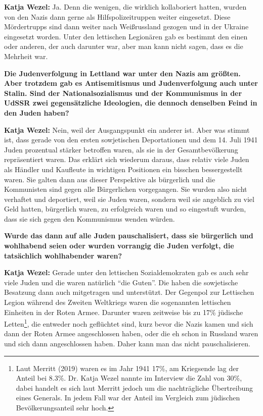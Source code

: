 \textbf{Katja Wezel:} Ja. Denn die wenigen, die wirklich kollaboriert hatten, wurden von den Nazis dann gerne als Hilfspolizeitruppen weiter eingesetzt. Diese Mördertrupps sind dann weiter nach Weißrussland gezogen und in der Ukraine eingesetzt worden. Unter den lettischen Legionären gab es bestimmt den einen oder anderen, der auch darunter war, aber man kann nicht sagen, dass es die Mehrheit war.

\textbf{Die Judenverfolgung in Lettland war unter den Nazis am größten. Aber trotzdem gab es Antisemitismus und Judenverfolgung auch unter Stalin. Sind der Nationalsozialismus und der Kommunismus in der UdSSR zwei gegensätzliche Ideologien, die dennoch denselben Feind in den Juden haben?}

\textbf{Katja Wezel:} Nein, weil der Ausgangspunkt ein anderer ist. Aber was stimmt ist, dass gerade von den ersten sowjetischen Deportationen und dem 14. Juli 1941 Juden prozentual stärker betroffen waren, als sie in der Gesamtbevölkerung repräsentiert waren. Das erklärt sich wiederum daraus, dass relativ viele Juden als Händler und Kaufleute in wichtigen Positionen ein bisschen bessergestellt waren. Sie galten dann aus dieser Perspektive als bürgerlich und die Kommunisten sind gegen alle Bürgerlichen vorgegangen. Sie wurden also nicht verhaftet und deportiert, weil sie Juden waren, sondern weil sie angeblich zu viel Geld hatten, bürgerlich waren, zu erfolgreich waren und so eingestuft wurden, dass sie sich gegen den Kommunismus wenden würden. 

\textbf{Wurde das dann auf alle Juden pauschalisiert, dass sie bürgerlich und wohlhabend seien oder wurden vorrangig die Juden verfolgt, die tatsächlich wohlhabender waren?} 

\textbf{Katja Wezel:} Gerade unter den lettischen Sozialdemokraten gab es auch sehr viele Juden und die waren natürlich ``die Guten''. Die haben die sowjetische Besatzung dann auch mitgetragen und unterstützt. Der Gegenpol zur Lettischen Legion während des Zweiten Weltkriegs waren die sogenannten lettischen Einheiten in der Roten Armee. Darunter waren zeitweise bis zu 17\% jüdische Letten\footnote{Laut Merritt (2019) waren es im Jahr 1941 17\%, am Kriegsende lag der Anteil bei 8.3\%. Dr. Katja Wezel nannte im Interview die Zahl von 30\%, dabei handelt es sich laut Merritt jedoch um die nachträgliche Übertreibung eines Generals. In jedem Fall war der Anteil im Vergleich zum jüdischen Bevölkerungsanteil sehr hoch.}, die entweder noch geflüchtet sind, kurz bevor die Nazis kamen und sich dann der Roten Armee angeschlossen haben, oder die eh schon in Russland waren und sich dann angeschlossen haben. Daher kann man das nicht pauschalisieren. 

